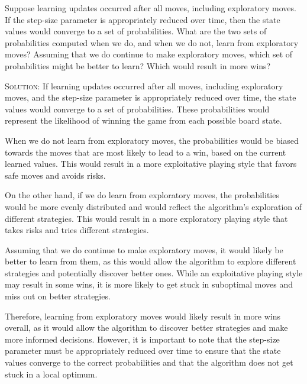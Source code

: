 \documentclass{article}
\begin{document}
Suppose learning updates occurred after all moves, including 
exploratory moves. If the step-size parameter is appropriately 
reduced over time, then the state values would converge to a set of 
probabilities. What are the two sets of probabilities computed 
when we do, and when we do not, learn from exploratory moves? 
Assuming that we do continue to make exploratory moves, which set 
of probabilities might be better to learn? Which would result in 
more wins?

\textsc{Solution:} If learning updates occurred after all moves, 
including exploratory moves, and the step-size parameter is 
appropriately reduced over time, the state values would converge to 
a set of probabilities. These probabilities would represent the 
likelihood of winning the game from each possible board state.

When we do not learn from exploratory moves, the 
probabilities would be biased towards the moves that are most 
likely to lead to a win, based on the current learned values. This 
would result in a more exploitative playing style that 
favors safe moves and avoids risks.

On the other hand, if we do learn from exploratory moves, the 
probabilities would be more evenly distributed and would reflect the 
algorithm's exploration of different strategies. This would 
result in a more exploratory playing style that takes risks and 
tries different strategies.

Assuming that we do continue to make exploratory moves, it would 
likely be better to learn from them, as this would allow the 
algorithm to explore different strategies and potentially 
discover better ones. While an exploitative playing style may 
result in some wins, it is more likely to get stuck in suboptimal 
moves and miss out on better strategies.

Therefore, learning from exploratory moves would likely 
result in more wins overall, as it would allow the algorithm to 
discover better strategies and make more informed decisions. 
However, it is important to note that the step-size parameter must 
be appropriately reduced over time to ensure that the state values 
converge to the correct probabilities and that the 
algorithm does not get stuck in a local optimum.
\end{document}

